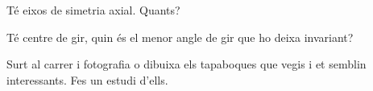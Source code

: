 \begin{mylist}
\begin{minipage}{0.5\textwidth}
\begin{tasks}
		\task Té eixos de simetria axial. Quants?
		
		\task Té centre de gir, quin és el menor angle de gir que ho deixa invariant?
		
		\task Surt al carrer i fotografia o dibuixa els tapaboques que vegis i et semblin interessants. Fes un estudi d'ells.
		
	\end{tasks}

\end{minipage}

\end{mylist}


